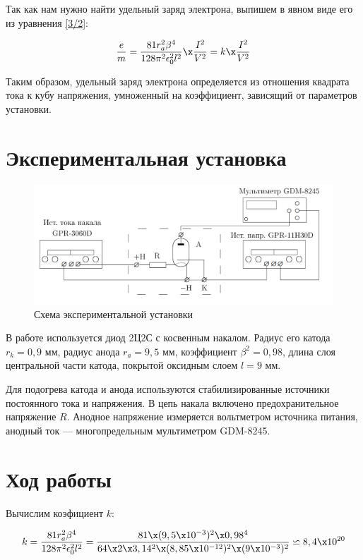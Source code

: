 \documentclass[12pt]{kiarticle} %
\begin{document}
Так как нам нужно найти удельный заряд электрона, выпишем в явном виде его из уравнения \eqref{3/2}:

\begin{equation}\label{e/m}
\dfrac{e}{m} = \dfrac{81r_a^2\beta^4}{128\pi^2\epsilon_0^2l^2} \x \dfrac{I^2}{V^2} = k \x \dfrac{I^2}{V^2}
\end{equation}

Таким образом, удельный заряд электрона определяется из отношения квадрата тока к кубу напряжения, умноженный на коэффициент, зависящий от параметров установки.

\section{Экспериментальная установка}
\begin{figure}[h]
	\includegraphics[width=15cm]{lab}
	\caption{Схема экспериментальной установки}
\end{figure}

В работе используется диод 2Ц2С с косвенным накалом. Радиус его катода $ r_k = 0,9 $ мм, радиус анода $ r_a = 9,5  $ мм, коэффициент $ \beta^2 = 0,98 $, длина слоя центральной части катода, покрытой оксидным слоем $ l = 9 $ мм.

Для подогрева катода и анода используются стабилизированные источники постоянного тока и напряжения. В цепь накала включено предохранительное напряжение $ R $. Анодное напряжение измеряется вольтметром источника питания, анодный ток --- многопредельным мультиметром GDM-8245. 


\section{Ход работы}

Вычислим коэфициент $ k $:

\begin{equation}\label{}
k = \dfrac{81r_a^2\beta^4}{128\pi^2\epsilon_0^2l^2} = \dfrac {81\x(9,5\x10^{-3})^2\x0,98^4}{64\x2\x3,14^2\x(8,85\x10^{-12})^2\x(9\x10^{-3})^2} \backsimeq 8,4 \x 10^{20}
\end{equation}
\end{document}
